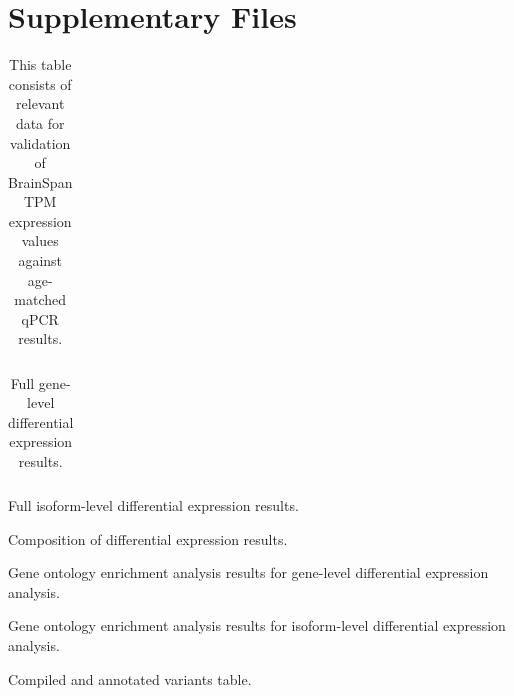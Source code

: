 \documentclass[12pt,chapterheads,final]{ucsd}
\begin{document}




\chapter*{Supplementary Files}
\begin{table}[!ht]
\caption[chau\_01\_supplementary\_table\_1.xlsx, This table consists of relevant data for validation of BrainSpan TPM expression values against age-matched qPCR results.]
{This table consists of relevant data for validation of BrainSpan TPM expression values against age-matched qPCR results.}
\begin{tabular}{|p{1in}|p{2in}|p{3in}|}
\end{tabular}
\end{table}
\begin{table}[!ht]
\caption[chau\_02\_supplementary\_table\_2.xlsx, Full gene-level differential expression results.]
{Full gene-level differential expression results.}
\begin{tabular}{|p{1in}|p{2in}|p{3in}|}
\end{tabular}
\end{table}
\begin{table}[!ht]
\caption[chau\_03\_supplementary\_table\_3.xlsx, Full isoform-level differential expression results.]
{Full isoform-level differential expression results.}
\end{table}
\begin{table}[!ht]
\caption[chau\_04\_supplementary\_table\_4.xlsx]
{Composition of differential expression results.}
\end{table}
\begin{table}[!ht]
\caption[chau\_05\_supplementary\_table\_5.xlsx, Gene ontology enrichment analysis results for gene-level differential expression analysis.]
{Gene ontology enrichment analysis results for gene-level differential expression analysis.}
\end{table}
\begin{table}[!ht]
\caption[chau\_06\_supplementary\_table\_6.xlsx, Gene ontology enrichment analysis results for isoform-level differential expression analysis.]
{Gene ontology enrichment analysis results for isoform-level differential expression analysis.}
\end{table}
\begin{table}[!ht]
\caption[chau\_07\_supplementary\_table\_7.xlsx, Compiled and annotated variants table.]
{Compiled and annotated variants table.}
\end{table}
\end{document}
